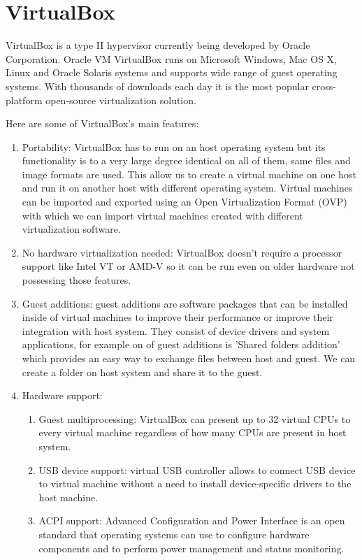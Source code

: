\section{VirtualBox}
VirtualBox is a type II hypervisor currently being developed by Oracle Corporation. Oracle VM VirtualBox runs on Microsoft Windows, Mac OS X, Linux and Oracle Solaris systems and supports wide range of guest operating systems. With thousands of downloads each day it is the most popular cross-platform open-source virtualization solution.

Here are some of VirtualBox's main features:
\begin{enumerate}
\item Portability: VirtualBox has to run on an host operating system but its functionality is to a very large degree identical on all of them, same files and image formats are used. This allow us to create a virtual machine on one host and run it on another host with different operating system. Virtual machines can be imported and exported using an Open Virtualization Format (OVP) with which we can import virtual machines created with different virtualization software.
\item No hardware virtualization needed: VirtualBox doesn't require a processor support like Intel VT or AMD-V so it can be run even on older hardware not possessing those features.
\item Guest additions: guest additions are software packages that can be installed inside of virtual machines to improve their performance or improve their integration with host system. They consist of device drivers and system applications, for example on of guest additions is 'Shared folders addition' which provides an easy way to exchange files between host and guest. We can create a folder on host system and share it to the guest.
\item Hardware support:
\begin{enumerate}
\item Guest multiprocessing: VirtualBox can present up to 32 virtual CPUs to every virtual machine regardless of how many CPUs are present in host system.
\item USB device support: virtual USB controller allows to connect USB device to virtual machine without a need to install device-specific drivers to the host machine.
\item ACPI support: Advanced Configuration and Power Interface is an open standard that operating systems can use to configure hardware components and to perform power management and status monitoring.

\end{enumerate}
\end{enumerate}
